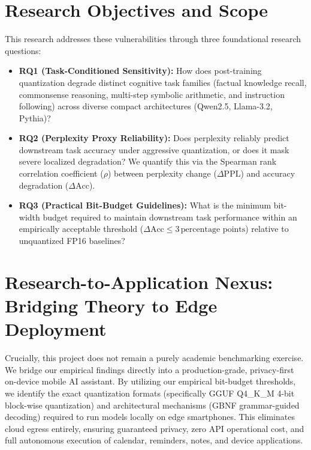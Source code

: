 \documentclass[12pt,a4paper,oneside]{report}
\begin{document}
\section{Research Objectives and Scope}
This research addresses these vulnerabilities through three foundational research questions:
\begin{itemize}[leftmargin=*]
    \item \textbf{RQ1 (Task-Conditioned Sensitivity):} How does post-training quantization degrade distinct cognitive task families (factual knowledge recall, commonsense reasoning, multi-step symbolic arithmetic, and instruction following) across diverse compact architectures (Qwen2.5, Llama-3.2, Pythia)?
    \item \textbf{RQ2 (Perplexity Proxy Reliability):} Does perplexity reliably predict downstream task accuracy under aggressive quantization, or does it mask severe localized degradation? We quantify this via the Spearman rank correlation coefficient ($\rho$) between perplexity change ($\Delta\text{PPL}$) and accuracy degradation ($\Delta\text{Acc}$).
    \item \textbf{RQ3 (Practical Bit-Budget Guidelines):} What is the minimum bit-width budget required to maintain downstream task performance within an empirically acceptable threshold ($\Delta\text{Acc} \le 3\,\text{percentage points}$) relative to unquantized FP16 baselines?
\end{itemize}

\section{Research-to-Application Nexus: Bridging Theory to Edge Deployment}
Crucially, this project does not remain a purely academic benchmarking exercise. We bridge our empirical findings directly into a production-grade, privacy-first on-device mobile AI assistant. By utilizing our empirical bit-budget thresholds, we identify the exact quantization formats (specifically GGUF Q4\_K\_M 4-bit block-wise quantization) and architectural mechanisms (GBNF grammar-guided decoding) required to run models locally on edge smartphones. This eliminates cloud egress entirely, ensuring guaranteed privacy, zero API operational cost, and full autonomous execution of calendar, reminders, notes, and device applications.

\end{document}
